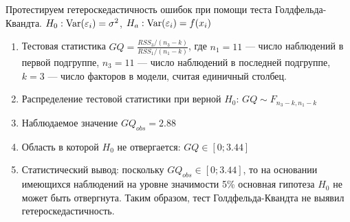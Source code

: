 \documentclass[pdftex,11pt,openany]{book}\usepackage[]{graphicx}\usepackage[]{color}
\begin{document}
\begin{solution}
Протестируем гетероскедастичность ошибок при помощи теста Голдфельда-
Квандта. $H_0: \operatorname{Var}(\varepsilon_i)=\sigma^2$, $H_a: \operatorname{Var}(\varepsilon_i)=f(x_i)$

\begin{enumerate}
\item Тестовая статистика $GQ=\frac{RSS_3/(n_3-k)}{RSS_1/(n_1-k)}$, где $n_1=11$ --- число наблюдений в первой подгруппе, $n_3=11$ --- число наблюдений в
последней подгруппе, $k=3$ --- число факторов в модели, считая единичный столбец.
\item Распределение тестовой статистики при верной $H_0$: $GQ\sim F_{n_3-k,n_1-k}$
\item Наблюдаемое значение $GQ_{obs}=2.88$
\item Область в которой $H_0$ не отвергается: $GQ\in [0;3.44]$
\item Статистический вывод: поскольку $GQ_{obs} \in [0;3.44]$, то на основании имеющихся наблюдений на уровне значимости 5\% основная гипотеза $H_0$ не может быть отвергнута. Таким образом, тест Голдфельда-Квандта не выявил гетероскедастичность.
\end{enumerate} 
\end{solution}
\end{document}
